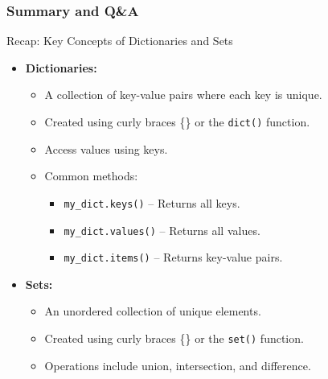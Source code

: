 \documentclass{beamer}
\begin{document}
\begin{frame}[fragile]
    \frametitle{Summary and Q\&A}
    \begin{block}{Recap: Key Concepts of Dictionaries and Sets}
        \begin{itemize}
            \item \textbf{Dictionaries:}
                \begin{itemize}
                    \item A collection of key-value pairs where each key is unique.
                    \item Created using curly braces \{\} or the \texttt{dict()} function.
                    \item Access values using keys.
                    \item Common methods: 
                        \begin{itemize}
                            \item \texttt{my\_dict.keys()} – Returns all keys.
                            \item \texttt{my\_dict.values()} – Returns all values.
                            \item \texttt{my\_dict.items()} – Returns key-value pairs.
                        \end{itemize}
                \end{itemize}
            \item \textbf{Sets:}
                \begin{itemize}
                    \item An unordered collection of unique elements.
                    \item Created using curly braces \{\} or the \texttt{set()} function.
                    \item Operations include union, intersection, and difference.
                \end{itemize}
        \end{itemize}
    \end{block}
\end{frame}
\end{document}
